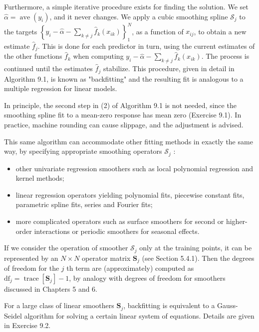 \documentclass[10pt]{article}
\begin{document}
Furthermore, a simple iterative procedure exists for finding the solution. We set $\hat{\alpha}=\operatorname{ave}\left(y_{i}\right)$, and it never changes. We apply a cubic smoothing spline $\mathcal{S}_{j}$ to the targets $\left\{y_{i}-\hat{\alpha}-\sum_{k \neq j} \hat{f}_{k}\left(x_{i k}\right)\right\}_{1}^{N}$, as a function of $x_{i j}$, to obtain a new estimate $\hat{f}_{j}$. This is done for each predictor in turn, using the current estimates of the other functions $\hat{f}_{k}$ when computing $y_{i}-\hat{\alpha}- \sum_{k \neq j} \hat{f}_{k}\left(x_{i k}\right)$. The process is continued until the estimates $\hat{f}_{j}$ stabilize. This procedure, given in detail in Algorithm 9.1, is known as "backfitting" and the resulting fit is analogous to a multiple regression for linear models.

In principle, the second step in (2) of Algorithm 9.1 is not needed, since the smoothing spline fit to a mean-zero response has mean zero (Exercise 9.1). In practice, machine rounding can cause slippage, and the adjustment is advised.

This same algorithm can accommodate other fitting methods in exactly the same way, by specifying appropriate smoothing operators $\mathcal{S}_{j}$ :

\begin{itemize}
  \item other univariate regression smoothers such as local polynomial regression and kernel methods;
  \item linear regression operators yielding polynomial fits, piecewise constant fits, parametric spline fits, series and Fourier fits;
  \item more complicated operators such as surface smoothers for second or higher-order interactions or periodic smoothers for seasonal effects.
\end{itemize}

If we consider the operation of smoother $\mathcal{S}_{j}$ only at the training points, it can be represented by an $N \times N$ operator matrix $\mathbf{S}_{j}$ (see Section 5.4.1). Then the degrees of freedom for the $j$ th term are (approximately) computed as $\mathrm{df}_{j}=\operatorname{trace}\left[\mathbf{S}_{j}\right]-1$, by analogy with degrees of freedom for smoothers discussed in Chapters 5 and 6.

For a large class of linear smoothers $\mathbf{S}_{j}$, backfitting is equivalent to a Gauss-Seidel algorithm for solving a certain linear system of equations. Details are given in Exercise 9.2.
\end{document}
